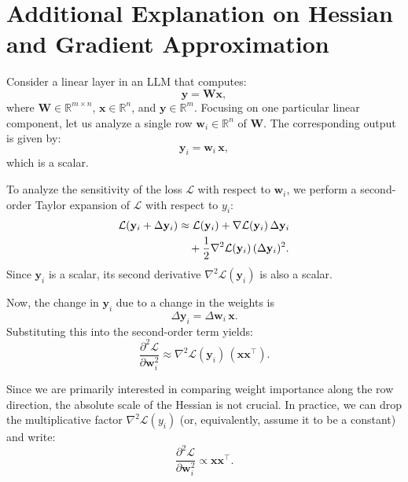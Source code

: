 \section{Additional Explanation on Hessian and Gradient Approximation}
\label{app:approxiation}

Consider a linear layer in an LLM that computes:
\begin{equation}
\mathbf{y} = \mathbf{W} \mathbf{x},
\end{equation}
where \(\mathbf{W} \in \mathbb{R}^{m \times n}\), \(\mathbf{x} \in \mathbb{R}^{n}\), and \(\mathbf{y} \in \mathbb{R}^{m}\). Focusing on one particular linear component, let us analyze a single row \(\mathbf{w}_i \in \mathbb{R}^{n}\) of \(\mathbf{W}\). The corresponding output is given by:
\begin{equation}
\mathbf{y}_i = \mathbf{w}_i \, \mathbf{x},
\end{equation}
which is a scalar.

To analyze the sensitivity of the loss \(\mathcal{L}\) with respect to \(\mathbf{w}_i\), we perform a second-order Taylor expansion of \(\mathcal{L}\) with respect to \(y_i\):
\begin{align}
\mathcal{L}(\mathbf{y}_i + \Delta \mathbf{y}_i) &\approx \mathcal{L}(\mathbf{y}_i) + \nabla \mathcal{L}(\mathbf{y}_i)\,\Delta \mathbf{y}_i \notag \\
&\quad + \frac{1}{2}\nabla^2 \mathcal{L}(\mathbf{y}_i)\,(\Delta \mathbf{y}_i)^2.
\end{align}
Since \(\mathbf{y}_i\) is a scalar, its second derivative \(\nabla^2 \mathcal{L}(\mathbf{y}_i)\) is also a scalar.

Now, the change in \(\mathbf{y}_i\) due to a change in the weights is
\begin{equation}
\Delta \mathbf{y}_i = \Delta \mathbf{w}_i\, \mathbf{x}.
\end{equation}
Substituting this into the second-order term yields:
\begin{equation}
\frac{\partial^2 \mathcal{L}}{\partial \mathbf{w}_i^2} \approx \nabla^2 \mathcal{L}(\mathbf{y}_i)\, (\mathbf{x} \mathbf{x}^\top).
\end{equation}

Since we are primarily interested in comparing weight importance along the row direction, the absolute scale of the Hessian is not crucial. In practice, we can drop the multiplicative factor \(\nabla^2 \mathcal{L}(y_i)\) (or, equivalently, assume it to be a constant) and write:
\begin{equation}
\frac{\partial^2 \mathcal{L}}{\partial \mathbf{w}_i^2} \propto \mathbf{x} \mathbf{x}^\top.
\end{equation}

